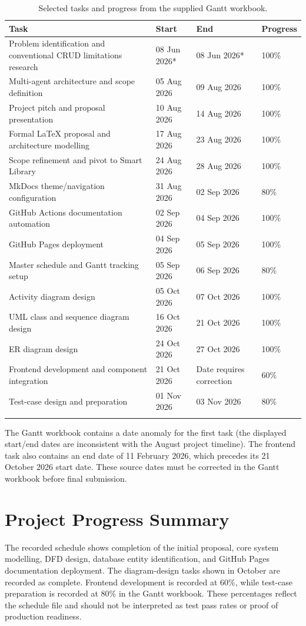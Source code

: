 \documentclass[12pt,a4paper]{report}
\begin{document}
\begin{longtable}{p{7.5cm}p{2.3cm}p{2.3cm}p{1.2cm}}
\toprule
\textbf{Task} & \textbf{Start} & \textbf{End} & \textbf{Progress}\\
\midrule
Problem identification and conventional CRUD limitations research & 08 Jun 2026* & 08 Jun 2026* & 100\%\\
Multi-agent architecture and scope definition & 05 Aug 2026 & 09 Aug 2026 & 100\%\\
Project pitch and proposal presentation & 10 Aug 2026 & 14 Aug 2026 & 100\%\\
Formal LaTeX proposal and architecture modelling & 17 Aug 2026 & 23 Aug 2026 & 100\%\\
Scope refinement and pivot to Smart Library & 24 Aug 2026 & 28 Aug 2026 & 100\%\\
MkDocs theme/navigation configuration & 31 Aug 2026 & 02 Sep 2026 & 80\%\\
GitHub Actions documentation automation & 02 Sep 2026 & 04 Sep 2026 & 100\%\\
GitHub Pages deployment & 04 Sep 2026 & 05 Sep 2026 & 100\%\\
Master schedule and Gantt tracking setup & 05 Sep 2026 & 06 Sep 2026 & 80\%\\
Activity diagram design & 05 Oct 2026 & 07 Oct 2026 & 100\%\\
UML class and sequence diagram design & 16 Oct 2026 & 21 Oct 2026 & 100\%\\
ER diagram design & 24 Oct 2026 & 27 Oct 2026 & 100\%\\
Frontend development and component integration & 21 Oct 2026 & Date requires correction & 60\%\\
Test-case design and preparation & 01 Nov 2026 & 03 Nov 2026 & 80\%\\
\bottomrule
\caption{Selected tasks and progress from the supplied Gantt workbook.}
\end{longtable}

\noindent *The Gantt workbook contains a date anomaly for the first task (the displayed start/end dates are inconsistent with the August project timeline). The frontend task also contains an end date of 11 February 2026, which precedes its 21 October 2026 start date. These source dates must be corrected in the Gantt workbook before final submission.

\section{Project Progress Summary}
The recorded schedule shows completion of the initial proposal, core system modelling, DFD design, database entity identification, and GitHub Pages documentation deployment. The diagram-design tasks shown in October are recorded as complete. Frontend development is recorded at 60\%, while test-case preparation is recorded at 80\% in the Gantt workbook. These percentages reflect the schedule file and should not be interpreted as test pass rates or proof of production readiness.
\end{document}
